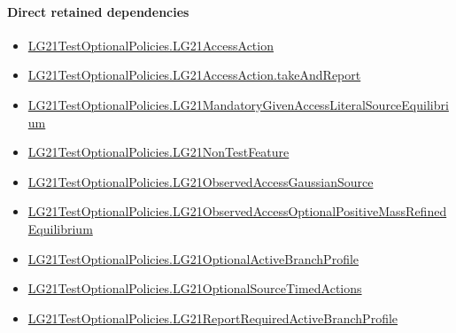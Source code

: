 \documentclass[10pt]{article}
\begin{document}
\paragraph{Direct retained dependencies}
\begin{itemize}\raggedright
\item \hyperlink{governing-declaration-90deccb685e0d8b3}{LG21\allowbreak{}Test\allowbreak{}Optional\allowbreak{}Policies.\allowbreak{}LG21\allowbreak{}Access\allowbreak{}Action}
\item \hyperlink{governing-declaration-ed459ca7da909742}{LG21\allowbreak{}Test\allowbreak{}Optional\allowbreak{}Policies.\allowbreak{}LG21\allowbreak{}Access\allowbreak{}Action.\allowbreak{}take\allowbreak{}And\allowbreak{}Report}
\item \hyperlink{governing-declaration-97e3a6cd16347ca5}{LG21\allowbreak{}Test\allowbreak{}Optional\allowbreak{}Policies.\allowbreak{}LG21\allowbreak{}Mandatory\allowbreak{}Given\allowbreak{}Access\allowbreak{}Literal\allowbreak{}Source\allowbreak{}Equilibrium}
\item \hyperlink{governing-declaration-81cb73bf3869c56d}{LG21\allowbreak{}Test\allowbreak{}Optional\allowbreak{}Policies.\allowbreak{}LG21\allowbreak{}Non\allowbreak{}Test\allowbreak{}Feature}
\item \hyperlink{governing-declaration-2b8ecce015c6e865}{LG21\allowbreak{}Test\allowbreak{}Optional\allowbreak{}Policies.\allowbreak{}LG21\allowbreak{}Observed\allowbreak{}Access\allowbreak{}Gaussian\allowbreak{}Source}
\item \hyperlink{governing-declaration-54d577fbb0a632ec}{LG21\allowbreak{}Test\allowbreak{}Optional\allowbreak{}Policies.\allowbreak{}LG21\allowbreak{}Observed\allowbreak{}Access\allowbreak{}Optional\allowbreak{}Positive\allowbreak{}Mass\allowbreak{}Refined\allowbreak{}Equilibrium}
\item \hyperlink{governing-declaration-4f1e0bb5ec5b1259}{LG21\allowbreak{}Test\allowbreak{}Optional\allowbreak{}Policies.\allowbreak{}LG21\allowbreak{}Optional\allowbreak{}Active\allowbreak{}Branch\allowbreak{}Profile}
\item \hyperlink{governing-declaration-c053cef5da7104c1}{LG21\allowbreak{}Test\allowbreak{}Optional\allowbreak{}Policies.\allowbreak{}LG21\allowbreak{}Optional\allowbreak{}Source\allowbreak{}Timed\allowbreak{}Actions}
\item \hyperlink{governing-declaration-a4ca58af5822aaeb}{LG21\allowbreak{}Test\allowbreak{}Optional\allowbreak{}Policies.\allowbreak{}LG21\allowbreak{}Report\allowbreak{}Required\allowbreak{}Active\allowbreak{}Branch\allowbreak{}Profile}

\end{itemize}
\end{document}
